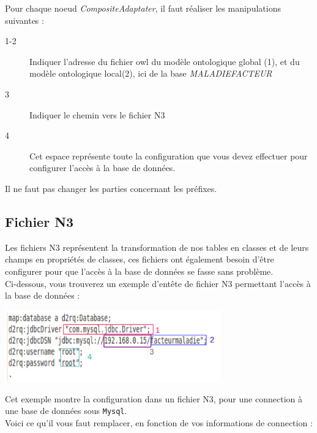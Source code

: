 \documentclass[12pt]{article}
\begin{document}
	Pour chaque noeud \textit{CompositeAdaptater}, il faut réaliser les manipulations suivantes :
	\begin{description}
	\item [1-2] Indiquer l'adresse du fichier owl du modèle ontologique global (1), et du modèle ontologique local(2), ici de la base \textit{MALADIEFACTEUR}
	\item [3] Indiquer le chemin vers le fichier N3
	\item [4] Cet espace représente toute la configuration que vous devez effectuer pour configurer l'accès à la base de données. 
	\end{description}
	\indent Il ne faut pas changer les parties concernant les préfixes.
	
	\subsection{Fichier N3}
	Les fichiers N3 représentent la transformation de nos tables en classes et de leurs champs en propriétés de classes, ces fichiers ont également besoin d'être configurer pour que l'accès à la base de données se fasse sans problème.\\
	\indent Ci-dessous, vous trouverez un exemple d'entête de fichier N3 permettant l'accès à la base de données : 
	\begin{center}
	\includegraphics[width=0.70\textwidth]{Image/configN3.png}
\end{center}
	\indent Cet exemple montre la configuration dans un fichier N3, pour une connection à une base de données sous \texttt{Mysql}. \\
	\indent Voici ce qu'il vous faut remplacer, en fonction de vos informations de connection : 
\end{document}

